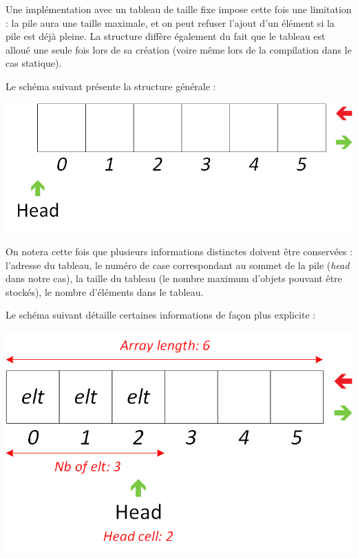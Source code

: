 \bigskip

Une implémentation avec un tableau de taille fixe impose cette fois une limitation : la pile aura une taille maximale, et on peut refuser l'ajout d'un élément si la pile est déjà pleine.
La structure diffère également du fait que le tableau est alloué une seule fois lors de sa création (voire même lors de la compilation dans le cas statique).

Le schéma suivant présente la structure générale :\\

\begin{center}
\includegraphics[scale=1]{Cours/Piles_5_Tableau_Statique_Structure.png}
\end{center}

\smallskip

On notera cette fois que plusieurs informations distinctes doivent être conservées : l'adresse du tableau, le numéro de case correspondant au sommet de la pile (\textit{head} dans notre cas), la taille du tableau (le nombre maximum d'objets pouvant être stockés), le nombre d'éléments dans le tableau.

Le schéma suivant détaille certaines informations de façon plus explicite :\\

\begin{center}
\includegraphics[scale=1]{Cours/Piles_5_Tableau_Statique_Structure_Detaillee.png}
\end{center}

